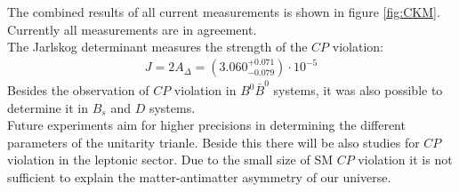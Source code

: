The combined results of all current measurements is shown in figure \ref{fig:CKM}. Currently all measurements are in agreement. \\
The Jarlskog determinant measures the strength of the $CP$ violation:
\begin{align}
	J = 2 A_{\Delta} = (3.060^{+0.071}_{-0.079}) \cdot 10^{-5}
\end{align}
Besides the observation of $CP$ violation in $B^0\bar{B}^0$ systems, it was also possible to determine it in $B_s$ and $D$ systems.\\
Future experiments aim for higher precisions in determining the different parameters of the unitarity trianle. Beside this there will be also studies for $CP$ violation in the leptonic sector. Due to the small size of SM $CP$ violation it is not sufficient to explain the matter-antimatter asymmetry of our universe.
